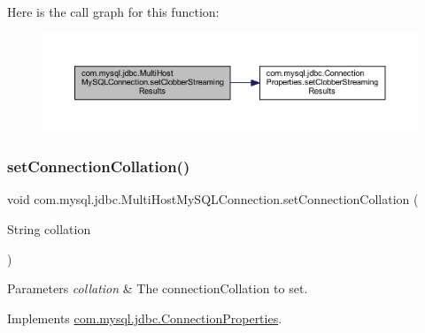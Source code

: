 Here is the call graph for this function\+:
\nopagebreak
\begin{figure}[H]
\begin{center}
\leavevmode
\includegraphics[width=350pt]{classcom_1_1mysql_1_1jdbc_1_1_multi_host_my_s_q_l_connection_aaa5a94dd2c2c57150920af50503b9764_cgraph}
\end{center}
\end{figure}
\mbox{\label{classcom_1_1mysql_1_1jdbc_1_1_multi_host_my_s_q_l_connection_ac34db9416951ec25adb28a76cffe5844}} 
\subsubsection{\texorpdfstring{set\+Connection\+Collation()}{setConnectionCollation()}}
{\footnotesize\ttfamily void com.\+mysql.\+jdbc.\+Multi\+Host\+My\+S\+Q\+L\+Connection.\+set\+Connection\+Collation (\begin{DoxyParamCaption}\item[{String}]{collation }\end{DoxyParamCaption})}


\begin{DoxyParams}{Parameters}
{\em collation} & The connection\+Collation to set. \\
\hline
\end{DoxyParams}


Implements \mbox{\hyperlink{interfacecom_1_1mysql_1_1jdbc_1_1_connection_properties_a69729667beed7cc9989d0b736d2cc28d}{com.\+mysql.\+jdbc.\+Connection\+Properties}}.

